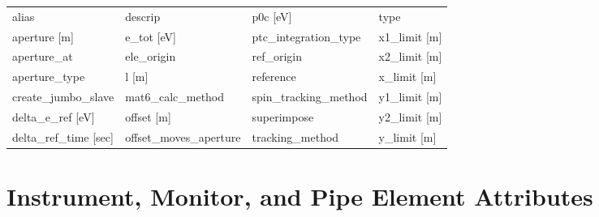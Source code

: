  \begin{tabular}{llll} \toprule
alias                            & descrip                          & p0c [eV]                         & type                             \\
aperture [m]                     & e_tot [eV]                       & ptc_integration_type             & x1_limit [m]                     \\
aperture_at                      & ele_origin                       & ref_origin                       & x2_limit [m]                     \\
aperture_type                    & l [m]                            & reference                        & x_limit [m]                      \\
create_jumbo_slave               & mat6_calc_method                 & spin_tracking_method             & y1_limit [m]                     \\
delta_e_ref [eV]                 & offset [m]                       & superimpose                      & y2_limit [m]                     \\
delta_ref_time [sec]             & offset_moves_aperture            & tracking_method                  & y_limit [m]                      \\
 \bottomrule
 \end{tabular}
 \vfill
 
 \section{Instrument, Monitor, and Pipe Element Attributes}
 \label{s:list.instrument}
 
